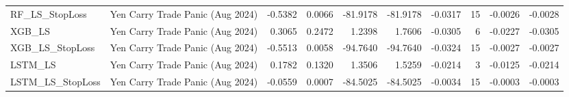 \begin{tabular}{llrrrrrrrr}
\cline{1-10}
RF\_LS\_StopLoss & Yen Carry Trade Panic (Aug 2024) & -0.5382 & 0.0066 & -81.9178 & -81.9178 & -0.0317 & 15 & -0.0026 & -0.0028 \\
\cline{1-10}
XGB\_LS & Yen Carry Trade Panic (Aug 2024) & 0.3065 & 0.2472 & 1.2398 & 1.7606 & -0.0305 & 6 & -0.0227 & -0.0305 \\
\cline{1-10}
XGB\_LS\_StopLoss & Yen Carry Trade Panic (Aug 2024) & -0.5513 & 0.0058 & -94.7640 & -94.7640 & -0.0324 & 15 & -0.0027 & -0.0027 \\
\cline{1-10}
LSTM\_LS & Yen Carry Trade Panic (Aug 2024) & 0.1782 & 0.1320 & 1.3506 & 1.5259 & -0.0214 & 3 & -0.0125 & -0.0214 \\
\cline{1-10}
LSTM\_LS\_StopLoss & Yen Carry Trade Panic (Aug 2024) & -0.0559 & 0.0007 & -84.5025 & -84.5025 & -0.0034 & 15 & -0.0003 & -0.0003 \\
\cline{1-10}
\bottomrule
\end{tabular}
